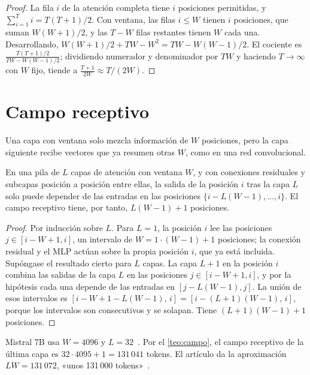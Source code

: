 \begin{proof}
La fila $i$ de la atención completa tiene $i$ posiciones permitidas, y $\sum_{i=1}^{T}i=T(T+1)/2$. Con ventana, las filas $i\le W$ tienen $i$ posiciones, que suman $W(W+1)/2$, y las $T-W$ filas restantes tienen $W$ cada una. Desarrollando, $W(W+1)/2+TW-W^{2}=TW-W(W-1)/2$. El cociente es $\frac{T(T+1)/2}{TW-W(W-1)/2}$; dividiendo numerador y denominador por $TW$ y haciendo $T\to\infty$ con $W$ fijo, tiende a $\frac{T+1}{2W}\approx T/(2W)$.
\end{proof}

\section{Campo receptivo}

Una capa con ventana solo mezcla información de $W$ posiciones, pero la capa siguiente recibe vectores que ya resumen otras $W$, como en una red convolucional.

\begin{teorema}\label{teo:campo}
En una pila de $L$ capas de atención con ventana $W$, y con conexiones residuales y subcapas posición a posición entre ellas, la salida de la posición $i$ tras la capa $L$ solo puede depender de las entradas en las posiciones $\{i-L(W-1),\dots,i\}$. El campo receptivo tiene, por tanto, $L(W-1)+1$ posiciones.
\end{teorema}

\begin{proof}
Por inducción sobre $L$. Para $L=1$, la posición $i$ lee las posiciones $j\in[i-W+1,i]$, un intervalo de $W=1\cdot(W-1)+1$ posiciones; la conexión residual y el MLP actúan sobre la propia posición $i$, que ya está incluida. Supóngase el resultado cierto para $L$ capas. La capa $L+1$ en la posición $i$ combina las salidas de la capa $L$ en las posiciones $j\in[i-W+1,i]$, y por la hipótesis cada una depende de las entradas en $[j-L(W-1),j]$. La unión de esos intervalos es $[i-W+1-L(W-1),\,i]=[i-(L+1)(W-1),\,i]$, porque los intervalos son consecutivos y se solapan. Tiene $(L+1)(W-1)+1$ posiciones.
\end{proof}

\begin{ejemplo}[Mistral 7B]\label{ej:mistral}
Mistral 7B usa $W=4096$ y $L=32$~\cite[tabla~1]{mistral}. Por el \cref{teo:campo}, el campo receptivo de la última capa es $32\cdot 4095+1=131\,041$ tokens. El artículo da la aproximación $LW=131\,072$, «unos 131\,000 tokens»~\cite[§2]{mistral}.
\end{ejemplo}

